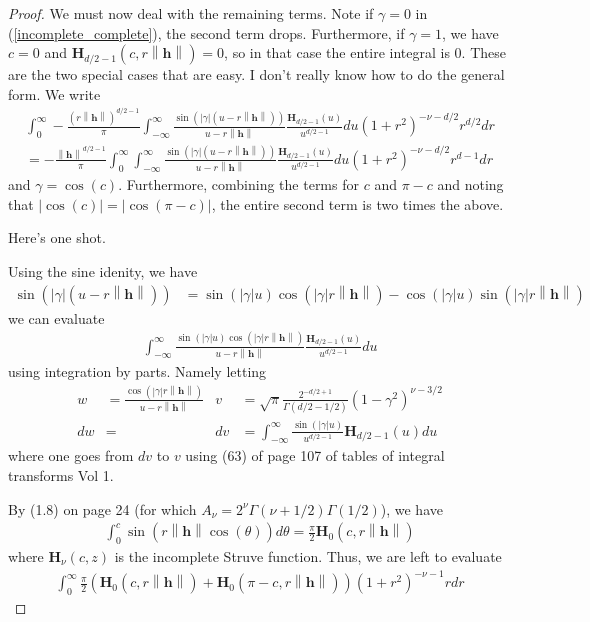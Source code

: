 \documentclass[11pt]{article}
\newcommand{\hh}{\left\lVert \boldsymbol{h}\right\rVert}
\begin{document}
\begin{proof}
We must now deal with the remaining terms. Note if $\gamma=0$ in (\ref{incomplete_complete}), the second term drops. Furthermore, if $\gamma=1$, we have $c=0$ and $\boldsymbol{H}_{d/2 - 1}(c,r\hh)= 0$, so in that case the entire integral is $0$. These are the two special cases that are easy. I don't really know how to do the general form. 
We write \begin{align*}
\int_0^\infty - \frac{(r\hh)^{d/2 - 1}}{\pi} \int_{-\infty}^\infty \frac{\sin(|\gamma|(u-r\hh))}{u-r\hh}\frac{\boldsymbol{H}_{d/2 - 1}(u)}{u^{d/2-1}} du (1+ r^2)^{-\nu-d/2} r^{d/2}dr  \\
=-\frac{\hh^{d/2 - 1}}{\pi}\int_0^\infty \int_{-\infty}^\infty \frac{\sin(|\gamma|(u-r\hh))}{u-r\hh}\frac{\boldsymbol{H}_{d/2 - 1}(u)}{u^{d/2-1}} du (1+ r^2)^{-\nu-d/2} r^{d-1}dr
\end{align*}and $\gamma=\cos(c)$. Furthermore, combining the terms for $c$ and $\pi-c$ and noting that $|\cos(c)| = |\cos(\pi-c)|$, the entire second term is two times the above.

\pagebreak

Here's one shot. 

Using the sine idenity, we have \begin{align*}
\sin(|\gamma|(u-r\hh)) &= \sin(|\gamma|u)\cos(|\gamma|r\hh) - \cos(|\gamma|u)\sin(|\gamma|r\hh)
\end{align*}we can evaluate \begin{align*}
\int_{-\infty}^\infty \frac{\sin(|\gamma|u)\cos(|\gamma|r\hh)}{u-r\hh}\frac{\boldsymbol{H}_{d/2 - 1}(u)}{u^{d/2-1}} du 
\end{align*}using integration by parts. Namely letting \begin{align*}
w &= \frac{\cos(|\gamma|r\hh)}{u - r\hh} & v &= \sqrt{\pi} \frac{2^{-d/2+1}}{\Gamma(d/2-1/2)} (1 - \gamma^2)^{\nu-3/2}\\
dw &= & dv&=\int_{-\infty}^\infty \frac{\sin(|\gamma|u)}{u^{d/2-1}} \boldsymbol{H}_{d/2-1}(u) du
\end{align*}where one goes from $dv$ to $v$ using (63) of page 107 of tables of integral transforms Vol 1.


\pagebreak

By (1.8) on page 24 (for which $A_\nu =2^\nu \Gamma(\nu+1/2)\Gamma(1/2)$), we have \begin{align*}
 \int_0^{c}  \sin(r\left\lVert \boldsymbol{h}\right\rVert \cos(\theta)) d\theta= \frac{\pi}{2} \boldsymbol{H}_{0}(c, r\left\lVert \boldsymbol{h}\right\rVert)
 \end{align*}where $\boldsymbol{H}_{\nu}(c, z)$ is the incomplete Struve function. Thus, we are left to evaluate \begin{align} 
 \int_0^\infty \frac{\pi}{2}\left(\boldsymbol{H}_{0}(c, r\left\lVert \boldsymbol{h}\right\rVert) + \boldsymbol{H}_{0}(\pi - c, r\left\lVert \boldsymbol{h}\right\rVert)\right) (1+r^2)^{-\nu-1} r dr\label{replace_expression}
 \end{align}
 

\end{proof}
\end{document}
